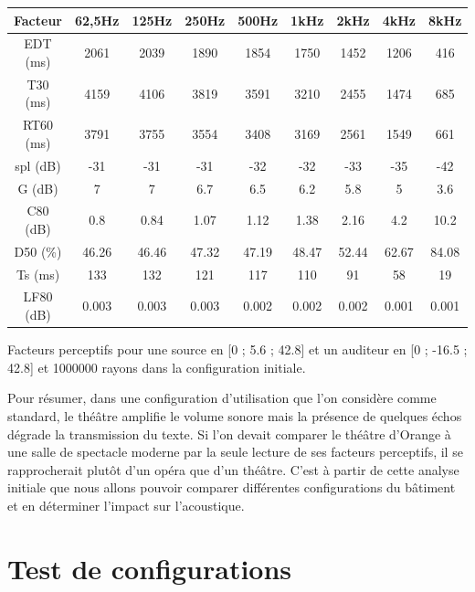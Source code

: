 \begin{tableth} 
 \begin{tabular}{| *{9}{c|}} 
 \hline 
 Facteur & 62,5Hz & 125Hz & 250Hz & 500Hz & 1kHz & 2kHz & 4kHz & 8kHz \\ 
 \hline 
 \hline 
\gls{EDT} (ms)& 2061& 2039& 1890& 1854& 1750& 1452& 1206& 416 \\ 
 \hline 
\gls{T30} (ms)& 4159& 4106& 3819& 3591& 3210& 2455& 1474& 685 \\ 
 \hline 
\gls{RT60} (ms)& 3791& 3755& 3554& 3408& 3169& 2561& 1549& 661 \\ 
 \hline 
\gls{spl} (dB)& -31& -31& -31& -32& -32& -33& -35& -42 \\ 
 \hline 
\gls{G} (dB)& 7& 7& 6.7& 6.5& 6.2& 5.8& 5& 3.6 \\ 
 \hline 
\gls{C80} (dB)& 0.8& 0.84& 1.07& 1.12& 1.38& 2.16& 4.2& 10.2 \\ 
 \hline 
\gls{D50} (\%)& 46.26& 46.46& 47.32& 47.19& 48.47& 52.44& 62.67& 84.08 \\ 
 \hline 
\gls{Ts} (ms)& 133& 132& 121& 117& 110& 91& 58& 19 \\ 
 \hline 
\gls{LF80} (dB)& 0.003& 0.003& 0.003& 0.002& 0.002& 0.002& 0.001& 0.001 \\ 
 \hline 
\end{tabular}
 \caption{Facteurs perceptifs pour une source en [0 ; 5.6 ; 42.8] et un auditeur en [0 ; -16.5 ; 42.8] et 1000000 rayons dans la configuration initiale.} 
 \label{tab_fact_init} 
 \end{tableth}

Pour résumer, dans une configuration d'utilisation que l'on considère comme standard, le théâtre amplifie le volume sonore mais la présence de quelques échos dégrade la transmission du texte. Si l'on devait comparer le théâtre d'Orange à une salle de spectacle moderne par la seule lecture de ses facteurs perceptifs, il se rapprocherait plutôt d'un opéra que d'un théâtre. C'est  à partir de cette analyse initiale que nous allons pouvoir comparer différentes configurations du bâtiment et en déterminer l'impact sur l'acoustique.


		
\chapter{Test de configurations}
	\minitoc
	\newpage

